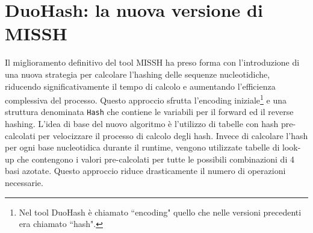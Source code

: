 \section{DuoHash: la nuova versione di MISSH}
\label{sec:DuoHash}

Il miglioramento definitivo del tool \acs{MISSH} ha preso forma con l'introduzione di una nuova strategia per calcolare l'hashing delle sequenze nucleotidiche, riducendo significativamente il tempo di calcolo e aumentando l'efficienza complessiva del processo. Questo approccio sfrutta l'encoding iniziale\footnote{Nel tool DuoHash è chiamato “encoding" quello che nelle versioni precedenti era chiamato “hash".} e una struttura denominata \verb|Hash| che contiene le variabili per il forward ed il reverse hashing. L'idea di base del nuovo algoritmo è l'utilizzo di tabelle con hash pre-calcolati per velocizzare il processo di calcolo degli hash. Invece di calcolare l'hash per ogni base nucleotidica durante il runtime, vengono utilizzate tabelle di look-up che contengono i valori pre-calcolati per tutte le possibili combinazioni di 4 basi azotate. Questo approccio riduce drasticamente il numero di operazioni necessarie.

